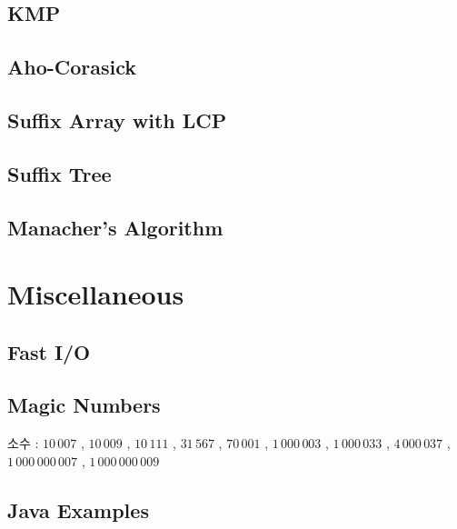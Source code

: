 \documentclass[10pt,landscape,a4paper,twocolumn]{article}
\begin{document}
\subsection{KMP}


\subsection{Aho-Corasick}


\subsection{Suffix Array with LCP}


\subsection{Suffix Tree}

\subsection{Manacher's Algorithm}



\section{Miscellaneous}

\subsection{Fast I/O}


\subsection{Magic Numbers}

소수 : $10\,007$ , $10\,009$ , $10\,111$ , $31\,567$ , $70\,001$ , $1\,000\,003$ , $1\,000\,033$ , $4\,000\,037$ , $1\,000\,000\,007$ , $1\,000\,000\,009$

\subsection{Java Examples}

\end{document}
